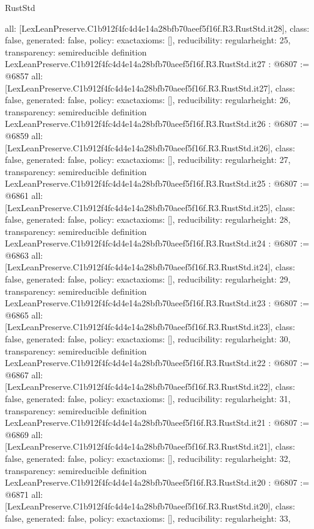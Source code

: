 \begin{lexlean}{RustStd}
\begin{coremodule}
{  all: [LexLeanPreserve.C1b912f4fc4d4e14a28bfb70aeef5f16f.R3.RustStd.it28],
  class: false,
  generated: false,
  policy: exact{axioms: []},
  reducibility: regular{height: 25},
  transparency: semireducible
}
definition LexLeanPreserve.C1b912f4fc4d4e14a28bfb70aeef5f16f.R3.RustStd.it27 : @6807 := @6857 {
  all: [LexLeanPreserve.C1b912f4fc4d4e14a28bfb70aeef5f16f.R3.RustStd.it27],
  class: false,
  generated: false,
  policy: exact{axioms: []},
  reducibility: regular{height: 26},
  transparency: semireducible
}
definition LexLeanPreserve.C1b912f4fc4d4e14a28bfb70aeef5f16f.R3.RustStd.it26 : @6807 := @6859 {
  all: [LexLeanPreserve.C1b912f4fc4d4e14a28bfb70aeef5f16f.R3.RustStd.it26],
  class: false,
  generated: false,
  policy: exact{axioms: []},
  reducibility: regular{height: 27},
  transparency: semireducible
}
definition LexLeanPreserve.C1b912f4fc4d4e14a28bfb70aeef5f16f.R3.RustStd.it25 : @6807 := @6861 {
  all: [LexLeanPreserve.C1b912f4fc4d4e14a28bfb70aeef5f16f.R3.RustStd.it25],
  class: false,
  generated: false,
  policy: exact{axioms: []},
  reducibility: regular{height: 28},
  transparency: semireducible
}
definition LexLeanPreserve.C1b912f4fc4d4e14a28bfb70aeef5f16f.R3.RustStd.it24 : @6807 := @6863 {
  all: [LexLeanPreserve.C1b912f4fc4d4e14a28bfb70aeef5f16f.R3.RustStd.it24],
  class: false,
  generated: false,
  policy: exact{axioms: []},
  reducibility: regular{height: 29},
  transparency: semireducible
}
definition LexLeanPreserve.C1b912f4fc4d4e14a28bfb70aeef5f16f.R3.RustStd.it23 : @6807 := @6865 {
  all: [LexLeanPreserve.C1b912f4fc4d4e14a28bfb70aeef5f16f.R3.RustStd.it23],
  class: false,
  generated: false,
  policy: exact{axioms: []},
  reducibility: regular{height: 30},
  transparency: semireducible
}
definition LexLeanPreserve.C1b912f4fc4d4e14a28bfb70aeef5f16f.R3.RustStd.it22 : @6807 := @6867 {
  all: [LexLeanPreserve.C1b912f4fc4d4e14a28bfb70aeef5f16f.R3.RustStd.it22],
  class: false,
  generated: false,
  policy: exact{axioms: []},
  reducibility: regular{height: 31},
  transparency: semireducible
}
definition LexLeanPreserve.C1b912f4fc4d4e14a28bfb70aeef5f16f.R3.RustStd.it21 : @6807 := @6869 {
  all: [LexLeanPreserve.C1b912f4fc4d4e14a28bfb70aeef5f16f.R3.RustStd.it21],
  class: false,
  generated: false,
  policy: exact{axioms: []},
  reducibility: regular{height: 32},
  transparency: semireducible
}
definition LexLeanPreserve.C1b912f4fc4d4e14a28bfb70aeef5f16f.R3.RustStd.it20 : @6807 := @6871 {
  all: [LexLeanPreserve.C1b912f4fc4d4e14a28bfb70aeef5f16f.R3.RustStd.it20],
  class: false,
  generated: false,
  policy: exact{axioms: []},
  reducibility: regular{height: 33},
}
\end{coremodule}
\end{lexlean}
